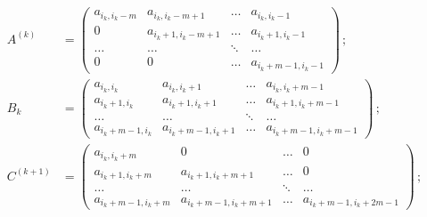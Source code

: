 \begin{align*}


A^{(k)} &=


\begin{pmatrix}


a_{i_k, i_k-m} & a_{i_k, i_k-m+1} & \ldots & a_{i_k, i_k-1}\\


0 & a_{i_k+1, i_k-m+1} & \ldots & a_{i_k+1, i_k-1}\\


\ldots &\ldots &\ddots&\ldots\\


0 & 0 & \ldots & a_{i_k+m-1,i_k-1}


\end{pmatrix}\,;\\


B_k & =


\begin{pmatrix}


a_{i_k, i_k} & a_{i_k, i_k+1} & \ldots & a_{i_k, i_k+m-1}\\


a_{i_k+1, i_k} & a_{i_k+1, i_k+1} & \ldots & a_{i_k+1, i_k+m-1}\\


\ldots &\ldots &\ddots&\ldots\\


a_{i_k+m-1, i_k}& a_{i_k+m-1,i_k+1} & \ldots & a_{i_k+m-1,i_k+m-1}


\end{pmatrix}\,;\\


C^{(k+1)} & =


\begin{pmatrix}


a_{i_k, i_k+m} & 0 & \ldots &0\\


a_{i_k+1,i_k+m} & a_{i_k+1, i_k+m+1} & \ldots & 0\\


\ldots &\ldots &\ddots&\ldots\\


a_{i_k+m-1,i_k+m} & a_{i_k+m-1,i_k+m+1} & \ldots & a_{i_k+m-1,i_k+2m-1}


\end{pmatrix}\,;


\end{align*}


